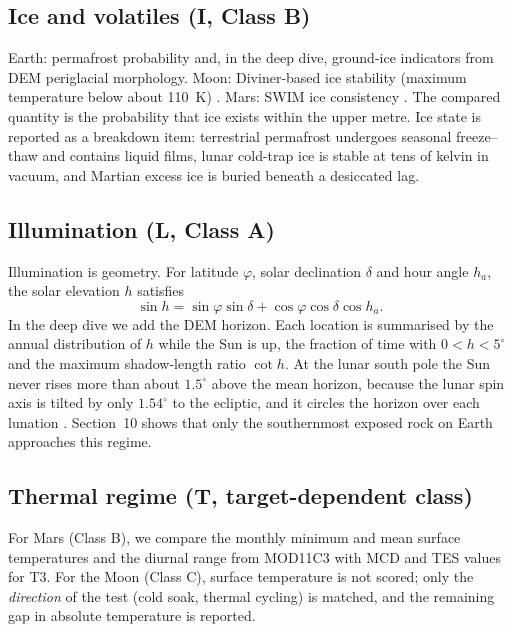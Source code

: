 \documentclass[11pt,a4paper]{article}
\begin{document}
\subsection{Ice and volatiles (I, Class B)}
Earth: permafrost probability \citep{esacci} and, in the deep dive, ground-ice indicators from DEM periglacial morphology. Moon: Diviner-based ice stability (maximum temperature below about 110~K) \citep{paige2010}. Mars: SWIM ice consistency \citep{morgan2021}. The compared quantity is the probability that ice exists within the upper metre. Ice state is reported as a breakdown item: terrestrial permafrost undergoes seasonal freeze--thaw and contains liquid films, lunar cold-trap ice is stable at tens of kelvin in vacuum, and Martian excess ice is buried beneath a desiccated lag.

\subsection{Illumination (L, Class A)}
Illumination is geometry. For latitude $\varphi$, solar declination $\delta$ and hour angle $h_a$, the solar elevation $h$ satisfies
\begin{equation*}
\sin h=\sin\varphi\sin\delta+\cos\varphi\cos\delta\cos h_a. \tag{5}
\end{equation*}
In the deep dive we add the DEM horizon. Each location is summarised by the annual distribution of $h$ while the Sun is up, the fraction of time with $0<h<5^\circ$ and the maximum shadow-length ratio $\cot h$. At the lunar south pole the Sun never rises more than about $1.5^\circ$ above the mean horizon, because the lunar spin axis is tilted by only $1.54^\circ$ to the ecliptic, and it circles the horizon over each lunation \citep{mazarico2011}. Section~10 shows that only the southernmost exposed rock on Earth approaches this regime.

\subsection{Thermal regime (T, target-dependent class)}
For Mars (Class B), we compare the monthly minimum and mean surface temperatures and the diurnal range from MOD11C3 with MCD and TES values for T3. For the Moon (Class C), surface temperature is not scored; only the \emph{direction} of the test (cold soak, thermal cycling) is matched, and the remaining gap in absolute temperature is reported.
\end{document}
